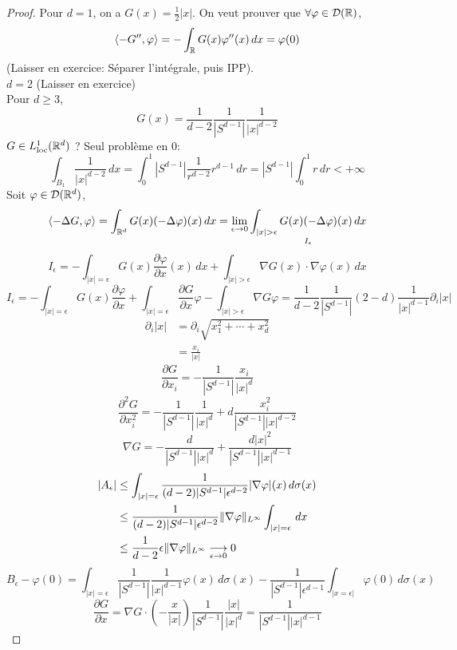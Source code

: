 \documentclass[]{report}
\begin{document}
    \begin{proof}
        Pour $d=1$, on a $G(x)=\frac{1}{2}|x|$. On veut prouver que $\forall \varphi\in \mathcal{D}(\mathbb{R})$,
        \[\langle -G'',\varphi \rangle=-\int_{\mathbb{R}}G(x)\varphi''(x)\, dx=\varphi(0)\]
        (Laisser en exercice: Séparer l'intégrale, puis IPP).\\
        $d=2$ (Laisser en exercice)\\
        Pour $d\ge 3$,
        \[G(x)=\frac{1}{d-2}\frac{1}{|S^{d-1}|}\frac{1}{|x|^{d-2}}\]
        $G\in L^1_{\text{loc}} (\mathbb{R}^d)$ ? Seul problème en $0$:
        \[\int_{B_1}\frac{1}{|x|^{d-2}}\, dx=\int_{0}^{1}\left|S^{d-1}\right|\frac{1}{r^{d-2}}r^{d-1}\, dr=|S^{d-1}|\int_{0}^{1} r\, dr<+\infty\]
        Soit $\varphi\in \mathcal{D}(\mathbb{R}^d)$,
        \[\sca{-\Delta G, \varphi}=\int_{\R^d}G(x)(-\Delta \varphi)(x)\, dx=\lim_{\epsilon\to 0}\underset{I_\epsilon}{\int_{|x|>\epsilon}G(x)(-\Delta\varphi)(x)\, dx}\]
        \[I_\epsilon=-\int_{|x|=\epsilon} G(x)\frac{\partial \varphi}{\partial x}(x)\, dx +\int_{|x|>\epsilon}\nabla G(x)\cdot \nabla \varphi(x)\, dx\]
        \[I_\epsilon=-\int_{|x|=\epsilon} G(x)\frac{\partial\varphi}{\partial x}+\int_{|x|=\epsilon}\frac{\partial G}{\partial x}\varphi-\int_{|x|>\epsilon}\nabla G \varphi=\frac{1}{d-2}\frac{1}{|S^{d-1}|}(2-d)\frac{1}{|x|^{d-1}}\partial_i|x|\]
        \begin{align*}
            \partial_i|x|&=\partial_i\sqrt{x_1^2+\cdots+x_d^2}\\
            &=\frac{x_i}{|x|}
        \end{align*}
        \[\frac{\partial G}{\partial x_i}=-\frac{1}{|S^{d-1}|}\frac{x_i}{|x|^d}\]
        \[\frac{\partial^2 G}{\partial x_i^2}=-\frac{1}{|S^{d-1}|}\frac{1}{|x|^d}+d\frac{x_i^2}{|S^{d-1}||x|^{d-2}}\]
        \[\nabla G=-\frac{d}{|S^{d-1}||x|^{d}}+\frac{d|x|^2}{|S^{d-1}||x|^{d-1}}\]
        \begin{align*}
            |A_\epsilon|&\le \int_{|x|=\epsilon}\frac{1}{(d-2)|S^{d-1}|\epsilon^{d-2}}|\nabla \varphi|(x)\, d\sigma(x)\\
            &\le \frac{1}{(d-2)|S^{d-1}|\epsilon^{d-2}}\lVert \nabla \varphi \rVert_{L^\infty}\int_{|x|=\epsilon}\, dx\\
            &\le \frac{1}{d-2}\epsilon \lVert \nabla \varphi \rVert_{L^\infty}\underset{\epsilon \to 0}{\longrightarrow} 0
        \end{align*}
        \[B_\epsilon-\varphi(0)=\int_{|x|=\epsilon}\frac{1}{|S^{d-1}|}\frac{1}{|x|^{d-1}}\varphi(x)\, d\sigma(x)-\frac{1}{|S^{d-1}|\epsilon^{d-1}}\int_{|x=\epsilon|}\varphi(0)\, d\sigma(x)\]
        \[\frac{\partial G}{\partial x}=\nabla G\cdot\left( -\frac{x}{|x|}\right)\frac{1}{|S^{d-1}|}\frac{|x|}{|x|^d}=\frac{1}{|S^{d-1}||x|^{d-1}}\]

\end{proof}
\end{document}
